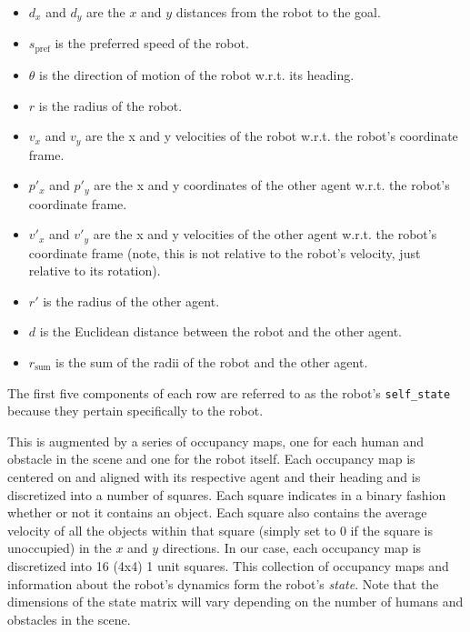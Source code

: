 \documentclass[letterpaper, 10 pt, conference]{ieeeconf}  %
\begin{document}
	\begin{itemize}
		\item $d_x$ and $d_y$ are the $x$ and $y$ distances from the robot to the goal.
		\item $s_\text{pref}$ is the preferred speed of the robot.
		\item $\theta$ is the direction of motion of the robot w.r.t. its heading.
		\item $r$ is the radius of the robot.
		\item $v_x$ and $v_y$ are the x and y velocities of the robot w.r.t. the robot's coordinate frame.
		\item $p'_x$ and $p'_y$ are the x and y coordinates of the other agent w.r.t. the robot's coordinate frame.
		\item $v'_x$ and $v'_y$ are the x and y velocities of the other agent w.r.t. the robot's coordinate frame (note, this is not relative to the robot's velocity, just relative to its rotation).
		\item $r'$ is the radius of the other agent.
		\item $d$ is the Euclidean distance between the robot and the other agent.
		\item $r_\text{sum}$ is the sum of the radii of the robot and the other agent.
	\end{itemize}

	The first five components of each row are referred to as the robot's \verb|self_state| because they pertain specifically to the robot.
	
	This is augmented by a series of occupancy maps, one for each human and obstacle in the scene and one for the robot itself. Each occupancy map is centered on and aligned with its respective agent and their heading and is discretized into a number of squares. Each square indicates in a binary fashion whether or not it contains an object. Each square also contains the average velocity of all the objects within that square (simply set to $0$ if the square is unoccupied) in the $x$ and $y$ directions. In our case, each occupancy map is discretized into 16 (4x4) 1 unit squares. This collection of occupancy maps and information about the robot's dynamics form the robot's \textit{state}. Note that the dimensions of the state matrix will vary depending on the number of humans and obstacles in the scene.
	
\end{document}
